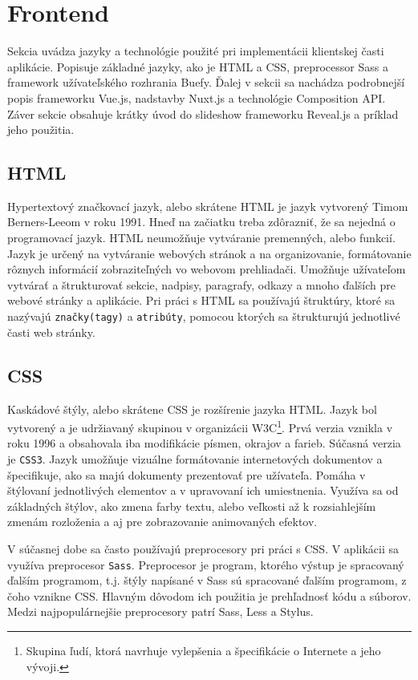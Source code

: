 \section{Frontend}
Sekcia uvádza jazyky a technológie použité pri implementácii klientskej časti aplikácie. Popisuje základné jazyky, ako je HTML a CSS, preprocessor Sass a framework užívateľského rozhrania Buefy. Ďalej v sekcii sa nachádza podrobnejší popis frameworku Vue.js, nadstavby Nuxt.js a technológie Composition API. Záver sekcie obsahuje krátky úvod do slideshow frameworku Reveal.js a príklad jeho použitia. 

\subsection{HTML}
Hypertextový značkovací jazyk\cite{html}, alebo skrátene HTML je jazyk vytvorený Timom Berners-Leeom v roku 1991. Hneď na začiatku treba zdôrazniť, že sa nejedná o programovací jazyk. HTML neumožňuje vytváranie premenných, alebo funkcií. Jazyk je určený na vytváranie webových stránok a na organizovanie, formátovanie rôznych informácií zobraziteľných vo webovom prehliadači. Umožňuje užívateľom vytvárať a štrukturovať sekcie, nadpisy, paragrafy, odkazy a mnoho ďalších pre webové stránky a aplikácie. Pri práci s HTML sa používajú štruktúry, ktoré sa nazývajú \texttt{značky(tagy)} a \texttt{atribúty}, pomocou ktorých sa štrukturujú jednotlivé časti web stránky. 

\subsection{CSS}
Kaskádové štýly\cite{css}, alebo skrátene CSS je rozšírenie jazyka HTML. Jazyk bol vytvorený a je udržiavaný skupinou v organizácii W3C\footnote{Skupina ľudí, ktorá navrhuje vylepšenia a špecifikácie o Internete a jeho vývoji.}.  Prvá verzia vznikla v roku 1996 a obsahovala iba modifikácie písmen, okrajov a farieb. Súčasná verzia je \texttt{CSS3}. Jazyk umožňuje vizuálne formátovanie internetových dokumentov a špecifikuje, ako sa majú dokumenty prezentovať pre užívateľa. Pomáha v štýlovaní jednotlivých elementov a v upravovaní ich umiestnenia. Využíva sa od základných štýlov, ako zmena farby textu, alebo veľkosti až k rozsiahlejším zmenám rozloženia a aj pre zobrazovanie animovaných efektov. 

V súčasnej dobe sa často používajú preprocesory pri práci s CSS. V aplikácii sa využíva preprocesor \texttt{Sass}. Preprocesor\cite{sass} je program, ktorého výstup je spracovaný ďalším programom, t.j. štýly napísané v Sass sú spracované ďalším programom, z čoho vznikne CSS. Hlavným dôvodom ich použitia je prehľadnosť kódu a súborov. Medzi najpopulárnejšie preprocesory patrí Sass, Less a Stylus.

